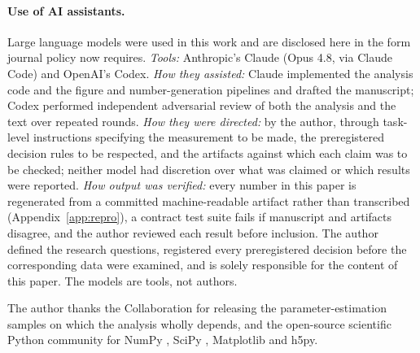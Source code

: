 \documentclass[aps,preprint,amsmath,amssymb,nofootinbib,superscriptaddress]{revtex4-2}
\begin{document}
\paragraph{Use of AI assistants.} Large language models were used in this work and are disclosed here
in the form journal policy now requires. \emph{Tools:} Anthropic's Claude (Opus 4.8, via Claude Code) and
OpenAI's Codex. \emph{How they assisted:} Claude implemented the analysis code and the figure and
number-generation pipelines and drafted the manuscript; Codex performed independent adversarial review of
both the analysis and the text over repeated rounds. \emph{How they were directed:} by the author, through
task-level instructions specifying the measurement to be made, the preregistered decision rules to be
respected, and the artifacts against which each claim was to be checked; neither model had discretion over
what was claimed or which results were reported. \emph{How output was verified:} every number in this
paper is regenerated from a committed machine-readable artifact rather than transcribed
(Appendix~\ref{app:repro}), a contract test suite fails if manuscript and artifacts disagree, and the
author reviewed each result before inclusion. The author defined the research questions, registered every
preregistered decision before the corresponding data were examined, and is
solely responsible for the content of this paper. The models are tools, not authors.

The author thanks the Collaboration for releasing the
parameter-estimation samples on which the analysis wholly depends, and the open-source scientific Python
community for NumPy \citep{numpy}, SciPy \citep{scipy}, Matplotlib \citep{matplotlib} and h5py.
\end{document}
